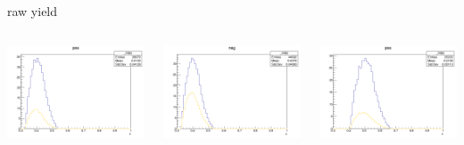 \begin{frame}{raw yield}
\begin{columns}
\begin{column}[T]{0.25\textwidth}
\includegraphics[width = \textwidth]{results/yield/statistics/yield_x_Q2_z_0.45_3.898_0.40_pos.png}
\end{column}
\begin{column}[T]{0.25\textwidth}
\includegraphics[width = \textwidth]{results/yield/statistics/yield_x_Q2_z_0.45_3.898_0.40_neg.png}
\end{column}
\begin{column}[T]{0.25\textwidth}
\includegraphics[width = \textwidth]{results/yield/statistics/yield_x_Q2_z_0.45_3.898_0.50_pos.png}

\end{column}
\end{columns}
\end{frame}
